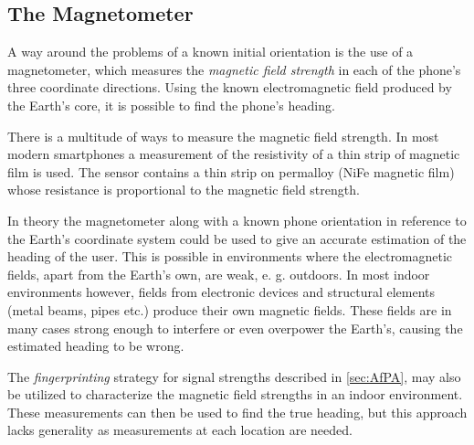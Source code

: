 \documentclass{LTHthesis}
\begin{document}
\subsection{The Magnetometer}
\label{subsec:mag}
%
A way around the problems of a known initial orientation is the use of a magnetometer, which measures the \emph{magnetic field strength} in each of the phone's three coordinate directions. Using the known electromagnetic field produced by the Earth's core, it is possible to find the phone's heading.

There is a multitude of ways to measure the magnetic field strength. In most modern smartphones a measurement of the resistivity of a thin strip of magnetic film is used. The sensor contains a thin strip on permalloy (NiFe magnetic film) whose resistance is proportional to the magnetic field strength.  

In theory the magnetometer along with a known phone orientation in reference to the Earth's coordinate system  could be used to give an accurate estimation of the heading of the user. This is possible in environments where the electromagnetic fields, apart from the Earth's own, are weak, e. g. outdoors. In most indoor environments however, fields from electronic devices and structural elements (metal beams, pipes etc.) produce their own magnetic fields. These fields are in many cases strong enough to interfere or even overpower the Earth's, causing the estimated heading to be wrong. 

The \emph{fingerprinting} strategy for signal strengths described in \ref{sec:AfPA}, may also be utilized to characterize the magnetic field strengths in an indoor environment. These measurements can then be used to find the true heading, but this approach lacks generality as measurements at each location are needed.  
%
\end{document}
